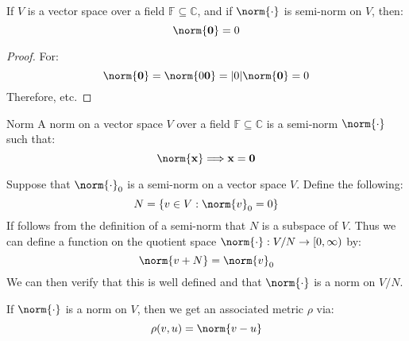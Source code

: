 \documentclass[crop=false,class=book,oneside]{standalone}
\begin{document}
            \begin{theorem}
                If $V$ is a vector space over a field
                $\mathbb{F}\subseteq\mathbb{C}$, and if
                $\norm{\cdot}$ is semi-norm on $V$, then:
                \begin{equation}
                    \norm{\mathbf{0}}=0
                \end{equation}
            \end{theorem}
            \begin{proof}
                For:
                \begin{equation}
                    \norm{\mathbf{0}}
                    =\norm{0\mathbf{0}}
                    =|0|\norm{\mathbf{0}}=0
                \end{equation}
                Therefore, etc.
            \end{proof}
            \begin{ldefinition}{Norm}
                A norm on a vector space $V$ over a
                field $\mathbb{F}\subseteq\mathbb{C}$
                is a semi-norm $\norm{\cdot}$ such that:
                \begin{equation}
                    \norm{\mathbf{x}}\Longrightarrow\mathbf{x}
                    =\mathbf{0}
                \end{equation}
            \end{ldefinition}
            \begin{lexample}
                Suppose that $\norm{\cdot}_{0}$ is a semi-norm
                on a vector space $V$. Define the following:
                \begin{equation}
                    N=\{v\in{V}:\norm{v}_{0}=0\}
                \end{equation}
                If follows from the definition of a semi-norm that
                $N$ is a subspace of $V$. Thus we can define a
                function on the quotient space
                $\norm{\cdot}:V/N\rightarrow[0,\infty)$ by:
                \begin{equation}
                    \norm{v+N}=\norm{v}_{0}
                \end{equation}
                We can then verify that this is well defined and
                that $\norm{\cdot}$ is a norm on $V/N$.
            \end{lexample}
            If $\norm{\cdot}$ is a norm on $V$, then we get an
            associated metric $\rho$ via:
            \begin{equation}
                \rho(v,u)=\norm{v-u}
            \end{equation}
\end{document}
